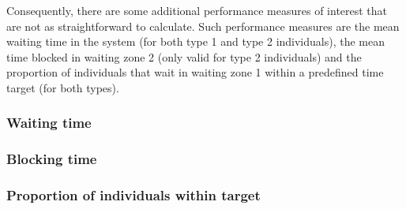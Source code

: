 Consequently, there are some additional performance measures of interest that
are not as straightforward to calculate.
Such performance measures are the mean waiting time in the system (for both
type 1 and type 2 individuals), the mean time blocked in waiting zone 2 (only
valid for type 2 individuals) and the proportion of individuals that wait in
waiting zone 1 within a predefined time target (for both types).

\subsubsection{Waiting time}

\subsubsection{Blocking time}

\subsubsection{Proportion of individuals within target}

